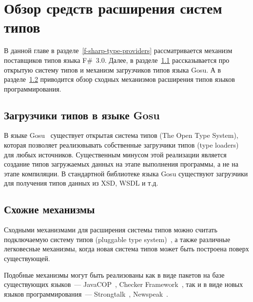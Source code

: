 \section{Обзор средств расширения систем типов}
В данной главе в разделе~\ref{f-sharp-type-providers} рассматривается механизм поставщиков типов языка F\#~3.0. Далее, в разделе~\ref{gosu-type-loaders} рассказывается про открытую систему типов и механизм загрузчиков типов языка Gosu. А в разделе~\ref{similar-mechanisms} приводится обзор сходных механизмов расширения типов языков программирования. 




\subsection{Загрузчики типов в языке Gosu}\label{gosu-type-loaders}
В языке Gosu~\cite{gosuguide} существует открытая система типов (The Open Type System), которая позволяет реализовывать собственные загрузчики типов (type loaders) для любых источников.
Существенным минусом этой реализации является создание типов загружаемых данных на этапе выполнения программы, а не на этапе компиляции.
В стандартной библиотеке языка Gosu существуют загрузчики для получения типов данных из XSD, WSDL и т.д.

\subsection{Схожие механизмы}\label{similar-mechanisms}
Сходными механизмами для расширения системы типов можно считать подключаемую систему типов (pluggable type system)~\cite{bracha}, а также различные легковесные механизмы, когда новая система типов может быть построена поверх существующей.

Подобные механизмы могут быть реализованы как в виде пакетов на базе существующих языков~--- JavaCOP~\cite{javacop2010}, Checker Framework~\cite{checkerframework2008},
так и в виде новых языков программирования~--- Strongtalk~\cite{strongtalk1993}, Newspeak~\cite{newspeak2008}.

